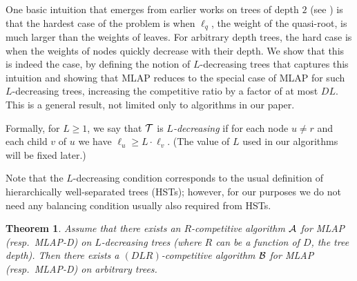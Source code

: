 \documentclass[a4paper]{article}
\newtheorem{theorem}{Theorem}[section]
\newcommand{\calA}{{\cal A}}
\newcommand{\calB}{{\cal B}}
\newcommand{\calT}{{\cal T}}
\newcommand{\length}{\ell}
\newcommand{\MLAP}{\mbox{\rm\textsf{MLAP}}}
\newcommand{\MLAPD}{\mbox{\rm\textsf{MLAP-D}}}
\begin{document}
One basic intuition that emerges from earlier works on trees of depth
$2$ (see \cite{jrp-online-buchbinder,aggregation-bkv,jrp-soda-2014})
is that the hardest case of the problem is when $\length_q$, the
weight of the quasi-root, is much larger than the weights of
leaves. For arbitrary depth trees, the hard case is when the weights
of nodes quickly decrease with their depth. We show that this is
indeed the case, by defining the notion of $L$-decreasing trees that
captures this intuition and showing that {\MLAP} reduces to the
special case of {\MLAP} for such $L$-decreasing trees, increasing the
competitive ratio by a factor of at most $DL$.  This is a general
result, not limited only to algorithms in our paper.

Formally, for $L\ge 1$, we say
that $\calT$ is \emph{$L$-decreasing} if for each node $u\neq r$ and
each child $v$ of $u$ we have $\length_u \ge L\cdot \length_v$.
(The value of $L$ used in our algorithms will be fixed later.) 
 
Note that the $L$-decreasing condition corresponds to the usual
definition of hierarchically well-separated trees (HSTs); however, for our
purposes we do not need any balancing condition usually also required from HSTs.


\begin{theorem}\label{thm:reduction}
Assume that there exists an $R$-competitive algorithm $\calA$ for
{\MLAP} (resp.~{\MLAPD}) on $L$-decreasing trees (where $R$ can be a
function of $D$, the tree depth).  Then there exists a
$(DLR)$-competitive algorithm $\calB$ for {\MLAP} (resp.~{\MLAPD}) on
arbitrary trees.
\end{theorem}
\end{document}

